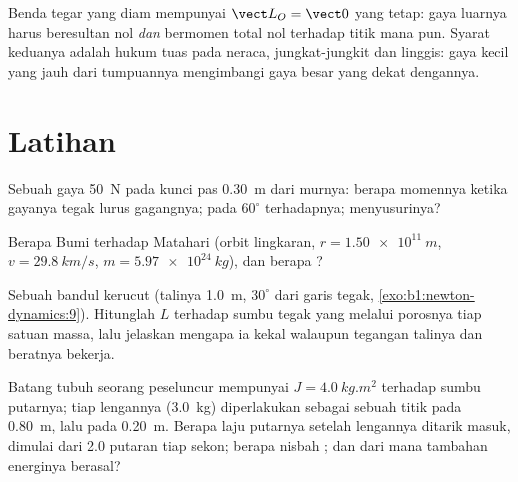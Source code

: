 \begin{remark}[Statika]\label{rem:b1:angular-momentum:statics}
Benda tegar yang diam mempunyai $\vect L_O = \vect 0$ yang tetap: gaya
luarnya harus beresultan nol \emph{dan} bermomen total nol terhadap
titik mana pun. Syarat keduanya adalah hukum tuas pada neraca,
jungkat-jungkit dan linggis: gaya kecil yang jauh dari tumpuannya
mengimbangi gaya besar yang dekat dengannya.
\end{remark}

\section{Latihan}

\begin{exercise}[$\star$]\label{exo:b1:angular-momentum:1}
Sebuah gaya \qty{50}{N} pada kunci pas \qty{0.30}{m} dari murnya: berapa
momennya ketika gayanya tegak lurus gagangnya; pada $60^\circ$
terhadapnya; menyusurinya?
\end{exercise}

\begin{exercise}[$\star$]\label{exo:b1:angular-momentum:2}
Berapa  Bumi terhadap Matahari (orbit lingkaran,
$r = \qty{1.50e11}{m}$, $v = \qty{29.8}{km/s}$, $m = \qty{5.97e24}{kg}$),
dan berapa ?
\end{exercise}

\begin{exercise}[$\star$]\label{exo:b1:angular-momentum:3}
Sebuah bandul kerucut (talinya \qty{1.0}{m}, $30^\circ$ dari garis
tegak, \cref{exo:b1:newton-dynamics:9}). Hitunglah $L$ terhadap sumbu
tegak yang melalui porosnya tiap satuan massa, lalu jelaskan mengapa ia
kekal walaupun tegangan talinya dan beratnya bekerja.
\end{exercise}

\begin{exercise}[$\star$]\label{exo:b1:angular-momentum:4}
Batang tubuh seorang peseluncur mempunyai $J = \qty{4.0}{kg.m^2}$
terhadap sumbu putarnya; tiap lengannya (\qty{3.0}{kg}) diperlakukan
sebagai sebuah titik pada \qty{0.80}{m}, lalu pada \qty{0.20}{m}. Berapa
laju putarnya setelah lengannya ditarik masuk, dimulai dari \qty{2.0}{}
putaran tiap sekon; berapa nisbah ; dan dari mana
tambahan energinya berasal?
\end{exercise}

